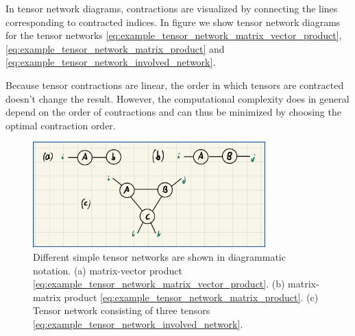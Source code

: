 In tensor network diagrams, contractions are visualized by connecting the lines corresponding to contracted indices. In figure  we show tensor network diagrams for the tensor networks \eqref{eq:example_tensor_network_matrix_vector_product}, \eqref{eq:example_tensor_network_matrix_product} and \eqref{eq:example_tensor_network_involved_network}. \par
Because tensor contractions are linear, the order in which tensors are contracted doesn't change the result. However, the computational complexity does in general depend on the order of contractions and can thus be minimized by choosing the optimal contraction order.
\begin{figure}
	\centering
	\includegraphics[width=0.8\textwidth]{figures/Tensor_Networks/basic_tensor_network_diagrams.jpeg}
	\caption{Different simple tensor networks are shown in diagrammatic notation. (a) matrix-vector product \eqref{eq:example_tensor_network_matrix_vector_product}. (b) matrix-matrix product \eqref{eq:example_tensor_network_matrix_product}. (c) Tensor network consisting of three tensors \eqref{eq:example_tensor_network_involved_network}.}
	\label{fig:basic_tensor_network_diagrams}
\end{figure}